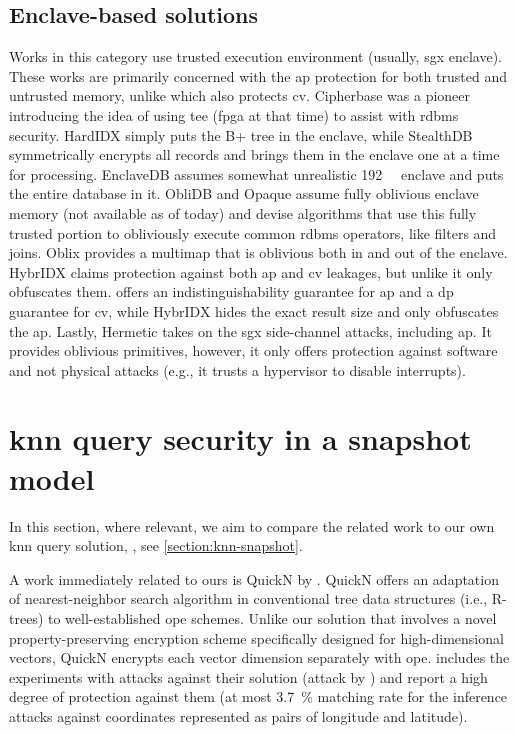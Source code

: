 		\subsection{Enclave-based solutions}

			Works in this category use trusted execution environment (usually, \acrshort{sgx} enclave).
			These works are primarily concerned with the \acrshort{ap} protection for both trusted and untrusted memory, unlike \epsolute{} which also protects \acrshort{cv}.
			Cipherbase \cite{cipherbase-daas} was a pioneer introducing the idea of using \acrshort{tee} (\acrshort{fpga} at that time) to assist with \acrshort{rdbms} security.
			HardIDX \cite{hardidx} simply puts the B+ tree in the enclave, while StealthDB \cite{stealth-db} symmetrically encrypts all records and brings them in the enclave one at a time for processing.
			EnclaveDB \cite{enclave-db} assumes somewhat unrealistic \SI{192}{\giga\byte} enclave and puts the entire database in it.
			ObliDB \cite{oblidb} and Opaque \cite{opaque} assume fully oblivious enclave memory (not available as of today) and devise algorithms that use this fully trusted portion to obliviously execute common \acrshort{rdbms} operators, like filters and joins.
			Oblix \cite{oblix} provides a multimap that is oblivious both in and out of the enclave.
			HybrIDX claims protection against both \acrshort{ap} and \acrshort{cv} leakages, but unlike \epsolute{} it only obfuscates them.
			\epsolute{} offers an indistinguishability guarantee for \acrshort{ap} and a \acrshort{dp} guarantee for \acrshort{cv}, while HybrIDX hides the exact result size and only obfuscates the \acrshort{ap}.
			Lastly, Hermetic \cite{hermetic} takes on the \acrshort{sgx} side-channel attacks, including \acrshort{ap}.
			It provides oblivious primitives, however, it only offers protection against software and not physical attacks (e.g., it trusts a hypervisor to disable interrupts).

	\section{\texorpdfstring{\acrshort{knn}}{kNN} query security in a snapshot model}\label{section:related-work:knn}

		In this section, where relevant, we aim to compare the related work to our own \acrshort{knn} query solution, \kanon{} \cite{k-anon}, see \cref{section:knn-snapshot}.

		A work immediately related to ours is QuickN by \textcite{quick-n}.
		QuickN offers an adaptation of nearest-neighbor search algorithm in conventional tree data structures (i.e., R-trees) to well-established \acrfull{ope} schemes.
		Unlike our solution that involves a novel property-preserving encryption scheme specifically designed for high-dimensional vectors, QuickN encrypts each vector dimension separately with \acrshort{ope}.
		\cite{quick-n} includes the experiments with attacks against their solution (attack by \textcite{leakage-abuse-grubs-2017}) and report a high degree of protection against them (at most \SI{3.7}{\percent} matching rate for the inference attacks against coordinates represented as pairs of longitude and latitude).

